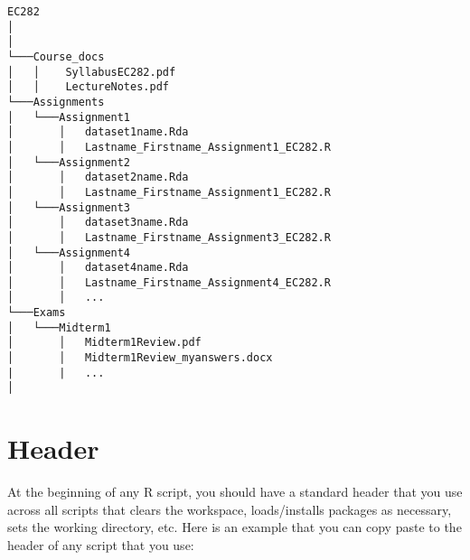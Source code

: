 \documentclass[
]{book}
\newenvironment{Shaded}{\begin{snugshade}}{\end{snugshade}}
\newcommand{\CommentTok}[1]{\textcolor[rgb]{0.56,0.35,0.01}{\textit{#1}}}
\newcommand{\ControlFlowTok}[1]{\textcolor[rgb]{0.13,0.29,0.53}{\textbf{#1}}}
\newcommand{\DataTypeTok}[1]{\textcolor[rgb]{0.13,0.29,0.53}{#1}}
\newcommand{\KeywordTok}[1]{\textcolor[rgb]{0.13,0.29,0.53}{\textbf{#1}}}
\newcommand{\NormalTok}[1]{#1}
\newcommand{\OperatorTok}[1]{\textcolor[rgb]{0.81,0.36,0.00}{\textbf{#1}}}
\newcommand{\StringTok}[1]{\textcolor[rgb]{0.31,0.60,0.02}{#1}}
\begin{document}
\begin{verbatim}
EC282
│  
│
└───Course_docs
│   │    SyllabusEC282.pdf
│   │    LectureNotes.pdf 
└───Assignments
│   └───Assignment1
│       │   dataset1name.Rda
│       │   Lastname_Firstname_Assignment1_EC282.R
│   └───Assignment2
│       │   dataset2name.Rda
│       │   Lastname_Firstname_Assignment1_EC282.R
│   └───Assignment3
│       │   dataset3name.Rda
│       │   Lastname_Firstname_Assignment3_EC282.R
│   └───Assignment4
│       │   dataset4name.Rda
│       │   Lastname_Firstname_Assignment4_EC282.R
│       │   ...
└───Exams
│   └───Midterm1
│       │   Midterm1Review.pdf
│       │   Midterm1Review_myanswers.docx
|       |   ...
│   
\end{verbatim}

\hypertarget{header}{%
\section{Header}\label{header}}

At the beginning of any R script, you should have a standard header that you use across all scripts that clears the workspace, loads/installs packages as necessary, sets the working directory, etc. Here is an example that you can copy paste to the header of any script that you use:

\begin{Shaded}
\end{Shaded}
\end{document}

